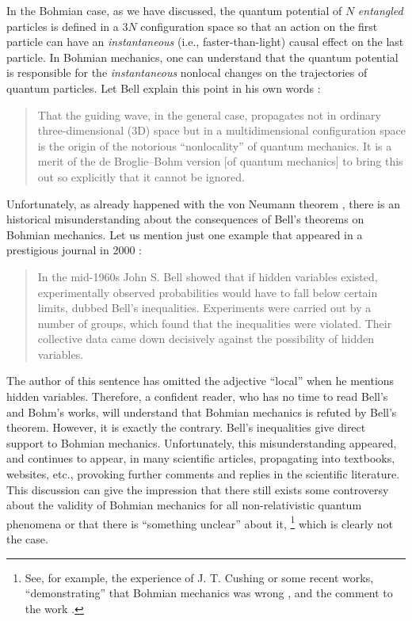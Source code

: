 \documentclass[nofootinbib, secnumarabic, amsmath, nobibnotes,10pt,aps,pra]{revtex4-1}
\begin{document}
In the Bohmian case, as we have discussed, the quantum potential of $N$ \textit{entangled} particles is defined in a $3N$ configuration space so that an action on the first particle can have an \textit{instantaneous} (i.e., faster-than-light) causal effect on the last particle. In Bohmian mechanics, one can understand that the quantum potential is responsible for the \textit{instantaneous} nonlocal changes on the trajectories of quantum particles.
Let Bell explain this point in his own words \cite{om.Bell1987}:\vspace*{-6pt}\\
\begin{quote}
That the guiding wave, in the general case, propagates not in
ordinary three-dimensional (3D) space but in a multidimensional
configuration space is the origin of the notorious ``nonlocality''
of quantum mechanics. It is a merit of the de Broglie--Bohm version
[of quantum mechanics] to bring this out so explicitly that it
cannot be ignored.\vspace*{-6pt}\\
\end{quote}

Unfortunately, as already happened with the von Neumann theorem \cite{om.impossibility_proofs}, there is an historical misunderstanding about the consequences of Bell's theorems on Bohmian mechanics. Let us mention just one example that appeared in a prestigious journal in 2000 \cite{om.100years}:\vspace*{-6pt}\\
\begin{quote}
In the mid-1960s John S. Bell showed that if hidden variables existed, experimentally observed probabilities would have to fall below certain limits, dubbed Bell's inequalities. Experiments were carried out by a number of groups, which found that the inequalities were violated. Their collective data came down decisively against the possibility of hidden variables.\vspace*{-6pt}\\
\end{quote}
The author of this sentence has omitted the adjective ``local'' when
he mentions hidden variables. Therefore, a confident reader, who has
no time to read Bell's and Bohm's works, will understand that
Bohmian mechanics is refuted by Bell's theorem. However, it is
exactly the contrary. Bell's inequalities give direct support to
Bohmian mechanics. Unfortunately, this misunderstanding appeared,
and continues to appear, in many scientific articles, propagating
into textbooks, websites, etc., provoking further comments and
replies in the scientific literature. This discussion can give the
impression that there still exists some controversy about the
validity of Bohmian mechanics for all non-relativistic quantum phenomena or that there is ``something unclear''
about  it,%
\footnote{See, for example, the experience
of J. T. Cushing \cite{om.erors2} or some recent works,
``demonstrating'' that Bohmian mechanics was wrong
\cite{om.bifoton2}, and the comment to the work
\cite{om.bifoton1}.} which is clearly not the case.\enlargethispage{-1pc}
\end{document}
